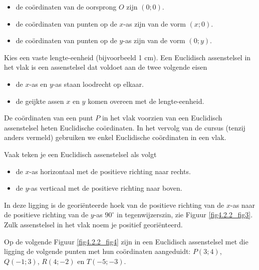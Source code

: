 \begin{opmerking}
	\begin{itemize}
\item de co\"ordinaten van de oorsprong $O$ zijn $(0;0)$.
\item de co\"ordinaten van punten op de $x$-as zijn van de vorm $(x;0)$.
\item de co\"ordinaten van punten op de $y$-as zijn van de vorm $(0;y)$.
\end{itemize}
\end{opmerking}

Kies een vaste lengte-eenheid (bijvoorbeeld 1 cm).
Een Euclidisch assenstelsel in het vlak is een assenstelsel dat voldoet aan de twee volgende eisen
\begin{itemize}
\item de $x$-as en $y$-as staan loodrecht op elkaar.
\item de geijkte assen $x$ en $y$ komen overeen met de lengte-eenheid.
\end{itemize}
De co\"ordinaten van een punt $P$ in het vlak voorzien van een Euclidisch assenstelsel heten Euclidische co\"ordinaten.
In het vervolg van de cursus (tenzij anders vermeld) gebruiken we enkel Euclidische co\"ordinaten in een vlak.

Vaak teken je een Euclidisch assenstelsel als volgt
\begin{itemize}
\item de $x$-as horizontaal met de positieve richting naar rechts.
\item de $y$-as verticaal met de positieve richting naar boven.
\end{itemize}
In deze ligging is de georiënteerde hoek van de positieve richting van de $x$-as naar de positieve richting van de $y$-as $90^{\circ}$ in tegenwijzerszin, zie Figuur \ref{fig4.2.2_fig3}.
Zulk assenstelsel in het vlak noem je positief geori\"enteerd.




Op de volgende Figuur \ref{fig4.2.2_fig4} zijn in een Euclidisch assenstelsel met die ligging de volgende punten met hun co\"ordinaten aangeduidt: $P(3;4)$, $Q(-1;3)$, $R(4;-2)$ en $T(-5;-3)$.

